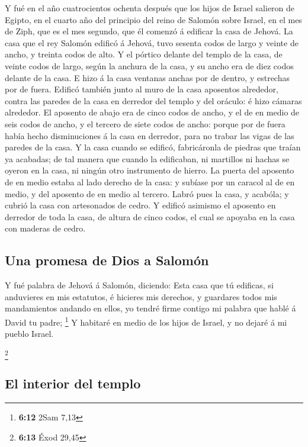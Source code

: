  Y fué en el año cuatrocientos ochenta después que los hijos
de Israel salieron de Egipto, en el cuarto año del principio del reino
de Salomón sobre Israel, en el mes de Ziph, que es el mes segundo, que
él comenzó á edificar la casa de Jehová.  La casa que el rey
Salomón edificó á Jehová, tuvo sesenta codos de largo y veinte de ancho,
y treinta codos de alto.  Y el pórtico delante del templo de
la casa, de veinte codos de largo, según la anchura de la casa, y su
ancho era de diez codos delante de la casa.  E hizo á la
casa ventanas anchas por de dentro, y estrechas por de fuera.
 Edificó también junto al muro de la casa aposentos
alrededor, contra las paredes de la casa en derredor del templo y del
oráculo: é hizo cámaras alrededor.  El aposento de abajo era
de cinco codos de ancho, y el de en medio de seis codos de ancho, y el
tercero de siete codos de ancho: porque por de fuera había hecho
disminuciones á la casa en derredor, para no trabar las vigas de las
paredes de la casa.  Y la casa cuando se edificó,
fabricáronla de piedras que traían ya acabadas; de tal manera que cuando
la edificaban, ni martillos ni hachas se oyeron en la casa, ni ningún
otro instrumento de hierro.  La puerta del aposento de en
medio estaba al lado derecho de la casa: y subíase por un caracol al de
en medio, y del aposento de en medio al tercero.  Labró pues
la casa, y acabóla; y cubrió la casa con artesonados de cedro.
 Y edificó asimismo el aposento en derredor de toda la
casa, de altura de cinco codos, el cual se apoyaba en la casa con
maderas de cedro.

\hypertarget{una-promesa-de-dios-a-salomuxf3n}{%
\subsection{Una promesa de Dios a
Salomón}\label{una-promesa-de-dios-a-salomuxf3n}}

 Y fué palabra de Jehová á Salomón, diciendo: 
Esta casa que tú edificas, si anduvieres en mis estatutos, é hicieres
mis derechos, y guardares todos mis mandamientos andando en ellos, yo
tendré firme contigo mi palabra que hablé á David tu padre; \footnote{\textbf{6:12}
  2Sam 7,13}  Y habitaré en medio de los hijos de Israel, y
no dejaré á mi pueblo Israel.

\footnote{\textbf{6:13} Éxod 29,45}

\hypertarget{el-interior-del-templo}{%
\subsection{El interior del templo}\label{el-interior-del-templo}}

